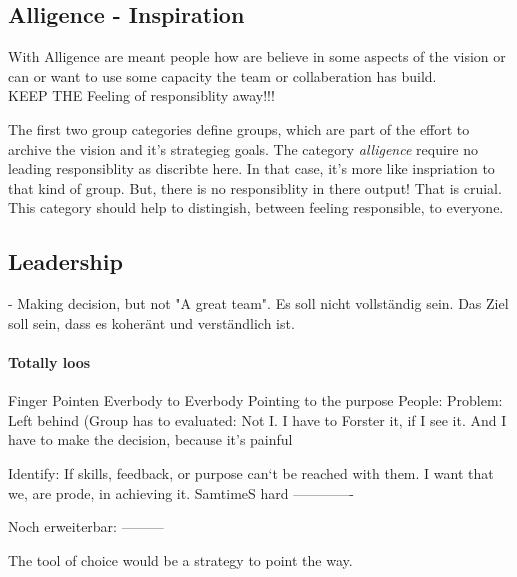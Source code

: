\subsection{Alligence - Inspiration}




With Alligence are meant people how are believe in some aspects of the vision or can or want to use some capacity the team or collaberation has build.\\

KEEP THE Feeling of responsiblity away!!! %

The first two group categories define groups, which are part of the effort to archive the vision and it's strategieg goals. The category \textit{alligence} require no leading responsiblity as discribte here. In that case, it's more like inspriation to that kind of group. But, there is no responsiblity in there output! That is cruial. This category should help to distingish, between feeling responsible, to everyone.


\subsection{Leadership}
- Making decision, but not "A great team".
Es soll nicht vollständig sein.
Das Ziel soll sein, dass es koheränt und verständlich ist.

\paragraph{Totally loos}

Finger Pointen Everbody to Everbody
Pointing to the purpose 
People: Problem: Left behind (Group has to evaluated: Not I. I have to Forster it, if I see it. And I have to make the decision, because it’s painful 

Identify: If skills, feedback, or purpose can‘t be reached with them.
I want that we, are prode, in achieving it. SamtimeS hard 
————-

Noch erweiterbar:
———



The tool of choice would be a strategy to point the way.\\

